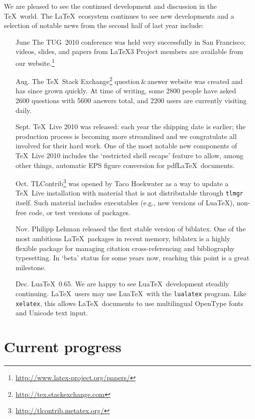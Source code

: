 \documentclass{ltnews}
\begin{document}
We are pleased to see the continued development and discussion in the \TeX\ world.
The \LaTeX\ ecosystem continues to see new developments and a selection of notable news from the second half of last year include:
\begin{itemize}
\item[June] The TUG~2010 conference was held very successfully in San
Francisco; videos, slides, and papers from \LaTeX3 Project members are available from our website.\footnote{\url{http://www.latex-project.org/papers/}}
\item[Aug.]
The \TeX\ Stack Exchange\footnote{\url{http://tex.stackexchange.com}} question\,\&\,answer website was created and has since grown quickly. At time of writing, some 2800 people have asked 2600 questions with 5600 answers total, and 2200 users are currently visiting daily.
\item[Sept.] \TeX\ Live 2010 was released: each year the shipping date is earlier; the production process is becoming more streamlined and we congratulate all involved for their hard work. One of the most notable new components of \TeX\ Live 2010 includes the `restricted shell escape' feature to allow, among other things, automatic EPS figure conversion for pdf\LaTeX\ documents.
\item[Oct.] TLContrib\footnote{\url{http://tlcontrib.metatex.org/}} was opened by Taco Hoekwater as a way to update a \TeX~Live installation with material that is not distributable through \verb|tlmgr| itself. Such material includes executables (e.g., new versions of Lua\TeX), non-free code, or test versions of packages.
\item[Nov.] Philipp Lehman released the first stable version of \textsf{biblatex}. One of the most ambitious \LaTeX\ packages in recent memory, \textsf{biblatex} is a highly flexible package for managing citation cross-referencing and bibliography typesetting. In `beta' status for some years now, reaching this point is a great milestone.
\item[Dec.] Lua\TeX\ 0.65. We are happy to see Lua\TeX\ development steadily continuing. \LaTeX\ users may use Lua\TeX\ with the \verb|lualatex| program. Like \verb|xelatex|, this allows \LaTeX\ documents to use multilingual OpenType fonts and Unicode text input.
\end{itemize}

\section{Current progress}
\end{document}
